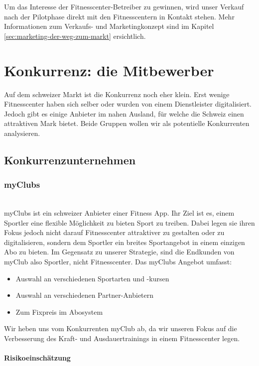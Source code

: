 Um das Interesse der Fitnesscenter-Betreiber zu gewinnen, wird unser Verkauf nach der Pilotphase direkt mit den Fitnesscentern in Kontakt stehen. Mehr Informationen zum Verkaufs- und Marketingkonzept sind im Kapitel \ref{sec:marketing-der-weg-zum-markt} ersichtlich.


\section{Konkurrenz: die Mitbewerber}\label{sec:konkurrenz-die-mitbewerber}

Auf dem schweizer Markt ist die Konkurrenz noch eher klein. Erst wenige Fitnesscenter haben sich selber oder wurden von einem Dienstleister digitalisiert. Jedoch gibt es einige Anbieter im nahen Ausland, für welche die Schweiz einen attraktiven Mark bietet. Beide Gruppen wollen wir als potentielle Konkurrenten analysieren.
\subsection{Konkurrenzunternehmen}
\subsubsection{myClubs}\hfill \\
myClubs\cite{myclubs} ist ein schweizer Anbieter einer Fitness App. Ihr Ziel ist es, einem Sportler eine flexible Möglichkeit zu bieten Sport zu treiben. Dabei legen sie ihren Fokus jedoch nicht darauf Fitnesscenter attraktiver zu gestalten oder zu digitalisieren, sondern dem Sportler ein breites Sportangebot in einem einzigen Abo zu bieten. Im Gegensatz zu unserer Strategie, sind die Endkunden von myClub also Sportler, nicht Fitnesscenter.
Das myClubs Angebot umfasst:
\begin{itemize}
	\item Auswahl an verschiedenen Sportarten und -kursen
	\item Auswahl an verschiedenen Partner-Anbietern
	\item Zum Fixpreis im Abosystem
\end{itemize}
Wir heben uns vom Konkurrenten myClub ab, da wir unseren Fokus auf die Verbesserung des Kraft- und Ausdauertrainings in einem Fitnesscenter legen.
\paragraph{Risikoeinschätzung} \qquad {}

